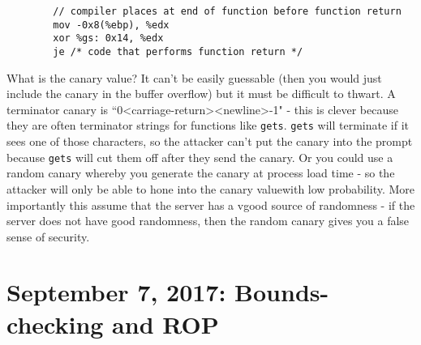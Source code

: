 \documentclass[12pt]{article}
\theoremstyle{definition}
\begin{document}
\begin{itemize}
\begin{lstlisting}
        // compiler places at end of function before function return
        mov -0x8(%ebp), %edx 
        xor %gs: 0x14, %edx
        je /* code that performs function return */
    \end{lstlisting}
    What is the canary value? It can't be easily guessable (then you would just include the canary in the buffer overflow) but it must be difficult to thwart. A terminator canary is ``0<carriage-return><newline>-1" - this is clever because they are often terminator strings for functions like \texttt{gets}. \texttt{gets} will terminate if it sees one of those characters, so the attacker can't put the canary into the prompt because \texttt{gets} will cut them off after they send the canary. Or you could use a random canary whereby you generate the canary at process load time - so the attacker will only be able to hone into the canary valuewith low probability. More importantly this assume that the server has a vgood source of randomness - if the server does not have good randomness, then the random canary gives you a false sense of security.
\end{itemize}

\section{September 7, 2017: Bounds-checking and ROP}
\end{document}
